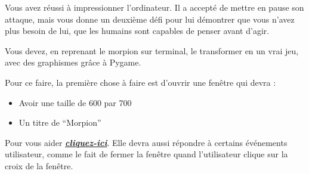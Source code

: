 \documentclass[a4paper]{article}
\begin{document}

\vspace*{1cm}

\vspace*{0.5cm}

\begin{flushleft}
\setlength{\parindent}{10ex}



\vspace*{1cm}

\setlength{\parindent}{3ex} Vous avez réussi à impressionner l’ordinateur. Il a accepté de mettre en pause son attaque, mais vous donne un deuxième défi pour lui démontrer que vous n’avez plus besoin de lui, que les humains sont capables de penser avant d’agir.

Vous devez, en reprenant le morpion sur terminal, le transformer en un vrai jeu, avec des graphismes grâce à Pygame.

Pour ce faire, la première chose à faire est d’ouvrir une fenêtre qui devra :
\begin{itemize}[label=\textbullet,font=\color{black}] 
\item Avoir une taille de 600 par 700 

\item Un titre de “Morpion”
\end{itemize}
Pour vous aider \href{https://zestedesavoir.com/tutoriels/846/pygame-pour-les-zesteurs/1381_a-la-decouverte-de-pygame/creer-une-simple-fenetre-personnalisable/#:~:text=Pour%20obtenir%20une%20fen%C3%AAtre%20comme,%2C%20et%20ce%20en%20FULLSCREEN%20%22.}{\textbf{\textit{cliquez-ici}}}.
 Elle devra aussi répondre à certains événements utilisateur, comme le fait de fermer la fenêtre quand l’utilisateur clique sur la croix de la fenêtre.

\vspace*{1cm}
\end{flushleft}

\newpage
\end{document}
